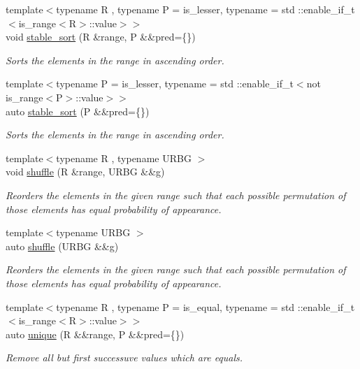 \begin{DoxyCompactItemize}
{\footnotesize template$<$typename R , typename P  = is\+\_\+lesser, typename  = std \+::enable\+\_\+if\+\_\+t$<$is\+\_\+range$<$\+R$>$\+::value$>$$>$ }\\void \mbox{\hyperlink{namespacerah_a215c9f80364af9121e2be42d1ebacdbf}{stable\+\_\+sort}} (R \&range, P \&\&pred=\{\})
\begin{DoxyCompactList}\small\item\em Sorts the elements in the range in ascending order. \end{DoxyCompactList}\item 
{\footnotesize template$<$typename P  = is\+\_\+lesser, typename  = std \+::enable\+\_\+if\+\_\+t$<$not is\+\_\+range$<$\+P$>$\+::value$>$$>$ }\\auto \mbox{\hyperlink{namespacerah_aa45a27d7e9403b82624632e1ee3daf6f}{stable\+\_\+sort}} (P \&\&pred=\{\})
\begin{DoxyCompactList}\small\item\em Sorts the elements in the range in ascending order. \end{DoxyCompactList}\item 
{\footnotesize template$<$typename R , typename U\+R\+BG $>$ }\\void \mbox{\hyperlink{namespacerah_ab1d00692710a6ee8e5b3110a56bbd59c}{shuffle}} (R \&range, U\+R\+BG \&\&g)
\begin{DoxyCompactList}\small\item\em Reorders the elements in the given range such that each possible permutation of those elements has equal probability of appearance. \end{DoxyCompactList}\item 
{\footnotesize template$<$typename U\+R\+BG $>$ }\\auto \mbox{\hyperlink{namespacerah_a93f2ab22986c011ca40816c52638e0ad}{shuffle}} (U\+R\+BG \&\&g)
\begin{DoxyCompactList}\small\item\em Reorders the elements in the given range such that each possible permutation of those elements has equal probability of appearance. \end{DoxyCompactList}\item 
{\footnotesize template$<$typename R , typename P  = is\+\_\+equal, typename  = std \+::enable\+\_\+if\+\_\+t$<$is\+\_\+range$<$\+R$>$\+::value$>$$>$ }\\auto \mbox{\hyperlink{namespacerah_a7c4f0afb068c908600b357e111148df7}{unique}} (R \&\&range, P \&\&pred=\{\})
\begin{DoxyCompactList}\small\item\em Remove all but first successuve values which are equals. \end{DoxyCompactList}\item 

\end{DoxyCompactItemize}
